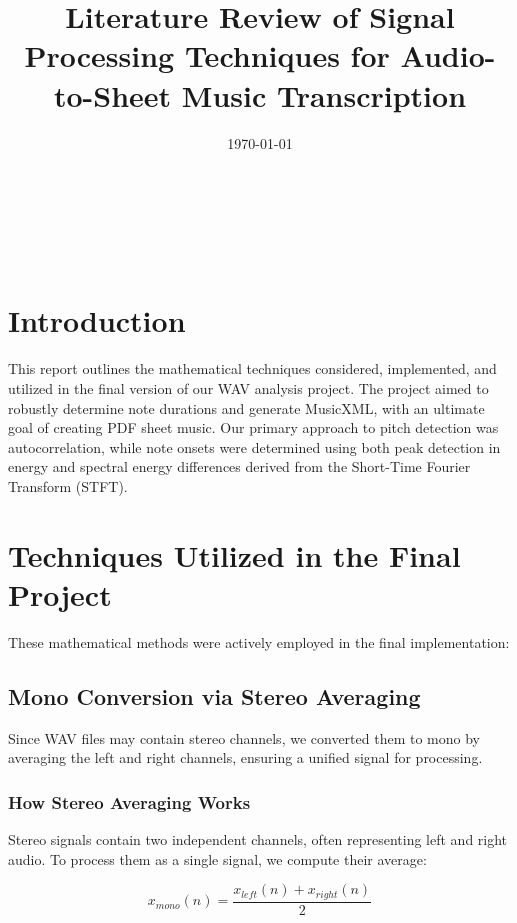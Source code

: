 \documentclass{article}
\begin{document}
\title{Literature Review of Signal Processing Techniques for Audio-to-Sheet Music Transcription}
\author{\authname}
\date{\today}
	
\maketitle
\thispagestyle{empty}

~\newpage


\tableofcontents

~\newpage

\section{Introduction}
This report outlines the mathematical techniques considered, implemented, and utilized in the final version of our WAV analysis project. The project aimed to robustly determine note durations and generate MusicXML, with an ultimate goal of creating PDF sheet music. Our primary approach to pitch detection was autocorrelation, while note onsets were determined using both peak detection in energy and spectral energy differences derived from the Short-Time Fourier Transform (STFT).

\section{Techniques Utilized in the Final Project}
These mathematical methods were actively employed in the final implementation:

\subsection{Mono Conversion via Stereo Averaging}
Since WAV files may contain stereo channels, we converted them to mono by averaging the left and right channels, ensuring a unified signal for processing.

\subsubsection{How Stereo Averaging Works}
Stereo signals contain two independent channels, often representing left and right audio. To process them as a single signal, we compute their average:

\begin{equation}
x_{mono}(n) = \frac{x_{left}(n) + x_{right}(n)}{2}
\end{equation}
\end{document}
